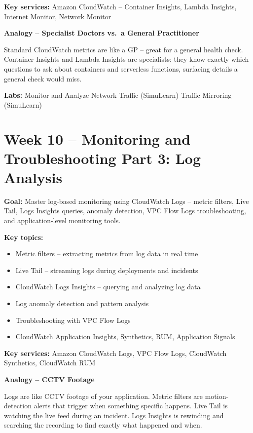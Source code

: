 \documentclass[12pt,a4paper]{article}
\begin{document}
\textbf{Key services:} Amazon CloudWatch -- Container Insights, Lambda Insights,
Internet Monitor, Network Monitor

\begin{analogybox}
\textbf{Analogy -- Specialist Doctors vs.\ a General Practitioner}

Standard CloudWatch metrics are like a GP -- great for a general health check.
Container Insights and Lambda Insights are specialists: they know exactly which
questions to ask about containers and serverless functions, surfacing details a
general check would miss.
\end{analogybox}

\textbf{Labs:} Monitor and Analyze Network Traffic (SimuLearn)
\textbullet{} Traffic Mirroring (SimuLearn)

\newpage

\section{Week 10 -- Monitoring and Troubleshooting Part 3: Log Analysis}

\textbf{Goal:} Master log-based monitoring using CloudWatch Logs -- metric filters,
Live Tail, Logs Insights queries, anomaly detection, VPC Flow Logs troubleshooting,
and application-level monitoring tools.

\textbf{Key topics:}
\begin{itemize}[leftmargin=1.5em]
  \item Metric filters -- extracting metrics from log data in real time
  \item Live Tail -- streaming logs during deployments and incidents
  \item CloudWatch Logs Insights -- querying and analyzing log data
  \item Log anomaly detection and pattern analysis
  \item Troubleshooting with VPC Flow Logs
  \item CloudWatch Application Insights, Synthetics, RUM, Application Signals
\end{itemize}

\textbf{Key services:} Amazon CloudWatch Logs, VPC Flow Logs, CloudWatch Synthetics,
CloudWatch RUM

\begin{analogybox}
\textbf{Analogy -- CCTV Footage}

Logs are like CCTV footage of your application. Metric filters are motion-detection
alerts that trigger when something specific happens. Live Tail is watching the live
feed during an incident. Logs Insights is rewinding and searching the recording to
find exactly what happened and when.
\end{analogybox}
\end{document}

